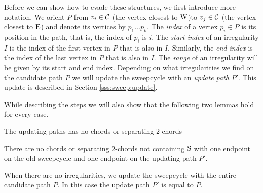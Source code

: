   Before we can show how to evade these structures, we first introduce more notation. We orient $P$ from $v_i \in \mathcal{C}$ (the vertex closest to $\mathrm{W}$)to $v_j \in \mathcal{C}$ (the vertex closest to $\mathrm{E}$) and denote its vertices by $p_1 \ldots p_k$.
  The \emph{index} of a vertex $p_i \in P$ is its position in the path, that is, the index of $p_i$ is $i$.
  The \emph{start index} of an irregularity $I$ is the index of the first vertex in $P$ that is also in $I$. Similarly, the \emph{end index} is the index of the last vertex in $P$ that is also in $I$.
  The \emph{range} of an irregularity will be given by its start and end index. Depending on what irregularities we find on the candidate path $P$ we will update the sweepcycle with an \emph{update path} $P'$. This update is described in Section \ref{sss:sweep:update}.

  While describing the steps we will also show that the following two lemmas hold for every case.

  \begin{lemma}
    The updating paths has no chords or separating $2$-chords
    \label{lm:sweep:augNoIregularity}
  \end{lemma}

  \begin{lemma}
    \label{lm:sweep:noConnectingIregularity}
    There are no chords or separating $2$-chords not containing $\mathrm{S}$ with one endpoint on the old sweepcycle and one endpoint on the updating path $P'$.
  \end{lemma}

    When there are no irregularities, we update the sweepcycle with the entire candidate path $P$.
    In this case the update path $P'$ is equal to $P$.

